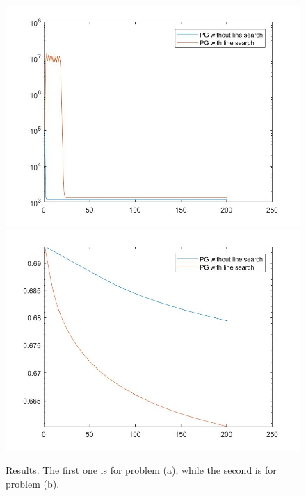 \documentclass{article}
\begin{document}
\begin{figure}[h]
\centering
\includegraphics[scale=0.4]{a.jpg}
\includegraphics[scale=0.4]{b.jpg}
\caption{Results. The first one is for problem (a), while the second is for problem (b).}
\end{figure}
\end{document}
